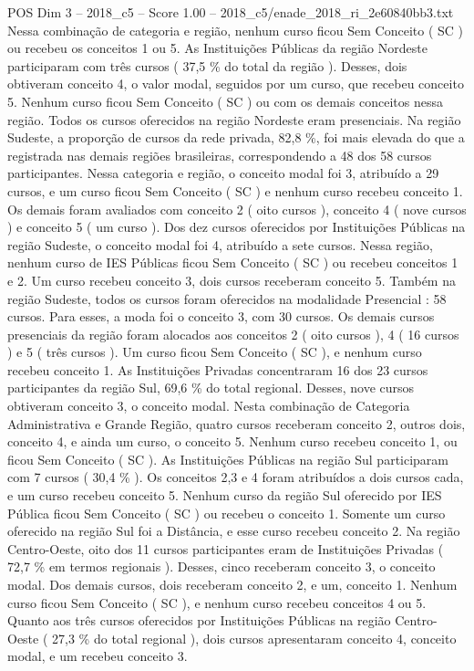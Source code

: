 \begin{textsample}{POS Dim 3 – 2018\_c5 – Score 1.00 – 2018\_c5/enade\_2018\_ri\_2e60840bb3.txt}
Nessa combinação de categoria e região, nenhum curso ficou Sem Conceito ( SC ) ou recebeu os conceitos 1 ou 5.
As Instituições Públicas da região Nordeste participaram com três cursos ( 37,5 \% do total da região ).
Desses, dois obtiveram conceito 4, o valor modal, seguidos por um curso, que recebeu conceito 5.
Nenhum curso ficou Sem Conceito ( SC ) ou com os demais conceitos nessa região.
Todos os cursos oferecidos na região Nordeste eram presenciais.
Na região Sudeste, a proporção de cursos da rede privada, 82,8 \%, foi mais elevada do que a registrada nas demais regiões brasileiras, correspondendo a 48 dos 58 cursos participantes.
Nessa categoria e região, o conceito modal foi 3, atribuído a 29 cursos, e um curso ficou Sem Conceito ( SC ) e nenhum curso recebeu conceito 1.
Os demais foram avaliados com conceito 2 ( oito cursos ), conceito 4 ( nove cursos ) e conceito 5 ( um curso ).
Dos dez cursos oferecidos por Instituições Públicas na região Sudeste, o conceito modal foi 4, atribuído a sete cursos.
Nessa região, nenhum curso de IES Públicas ficou Sem Conceito ( SC ) ou recebeu conceitos 1 e 2.
Um curso recebeu conceito 3, dois cursos receberam conceito 5.
Também na região Sudeste, todos os cursos foram oferecidos na modalidade Presencial : 58 cursos.
Para esses, a moda foi o conceito 3, com 30 cursos.
Os demais cursos presenciais da região foram alocados aos conceitos 2 ( oito cursos ), 4 ( 16 cursos ) e 5 ( três cursos ).
Um curso ficou Sem Conceito ( SC ), e nenhum curso recebeu conceito 1.
As Instituições Privadas concentraram 16 dos 23 cursos participantes da região Sul, 69,6 \% do total regional.
Desses, nove cursos obtiveram conceito 3, o conceito modal.
Nesta combinação de Categoria Administrativa e Grande Região, quatro cursos receberam conceito 2, outros dois, conceito 4, e ainda um curso, o conceito 5.
Nenhum curso recebeu conceito 1, ou ficou Sem Conceito ( SC ).
As Instituições Públicas na região Sul participaram com 7 cursos ( 30,4 \% ).
Os conceitos 2,3 e 4 foram atribuídos a dois cursos cada, e um curso recebeu conceito 5.
Nenhum curso da região Sul oferecido por IES Pública ficou Sem Conceito ( SC ) ou recebeu o conceito 1.
Somente um curso oferecido na região Sul foi a Distância, e esse curso recebeu conceito 2.
Na região Centro-Oeste, oito dos 11 cursos participantes eram de Instituições Privadas ( 72,7 \% em termos regionais ).
Desses, cinco receberam conceito 3, o conceito modal.
Dos demais cursos, dois receberam conceito 2, e um, conceito 1.
Nenhum curso ficou Sem Conceito ( SC ), e nenhum curso recebeu conceitos 4 ou 5.
Quanto aos três cursos oferecidos por Instituições Públicas na região Centro-Oeste ( 27,3 \% do total regional ), dois cursos apresentaram conceito 4, conceito modal, e um recebeu conceito 3.

\end{textsample}
